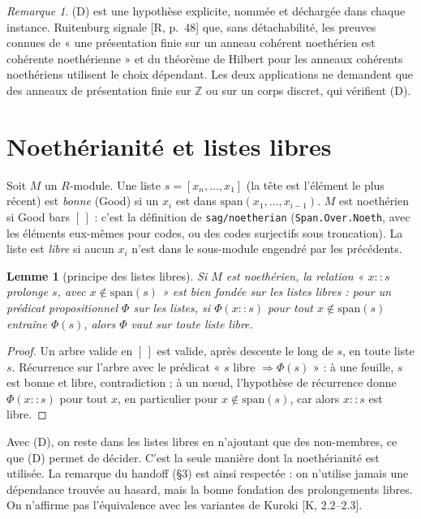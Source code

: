 \documentclass[11pt]{amsart}
\newtheorem{lemma}[theorem]{Lemme}
\theoremstyle{definition}
\theoremstyle{remark}
\newtheorem{remark}[theorem]{Remarque}
\newcommand{\sm}{\mathrm{span}}
\begin{document}
\begin{remark}
(D) est une hypothèse explicite, nommée et déchargée dans chaque
instance. Ruitenburg signale [R, p.~48] que, sans détachabilité, les
preuves connues de « une présentation finie sur un anneau cohérent
noethérien est cohérente noethérienne » et du théorème de Hilbert pour
les anneaux cohérents noethériens utilisent le choix dépendant. Les deux
applications ne demandent que des anneaux de présentation finie sur
$\mathbb Z$ ou sur un corps discret, qui vérifient (D).
\end{remark}

\section{Noethérianité et listes libres}\label{sec:noeth}

Soit $M$ un $R$-module. Une liste $s=[x_n,\dots,x_1]$ (la tête est
l'élément le plus récent) est \emph{bonne} (Good) si un $x_i$ est dans
$\sm(x_1,\dots,x_{i-1})$. $M$ est noethérien si Good bars $[\,]$ :
c'est la définition de \texttt{sag/noetherian} (\texttt{Span.Over.Noeth},
avec les éléments eux-mêmes pour codes, ou des codes surjectifs sous
troncation). La liste est \emph{libre} si aucun $x_i$ n'est dans le
sous-module engendré par les précédents.

\begin{lemma}[principe des listes libres]\label{lem:free}
Si $M$ est noethérien, la relation « $x::s$ prolonge $s$, avec $x\notin\sm(s)$ »
est bien fondée sur les listes libres : pour un prédicat propositionnel
$\Phi$ sur les listes, si $\Phi(x::s)$ pour tout $x\notin\sm(s)$ entraîne
$\Phi(s)$, alors $\Phi$ vaut sur toute liste libre.
\end{lemma}

\begin{proof}
Un arbre valide en $[\,]$ est valide, après descente le long de $s$, en
toute liste $s$. Récurrence sur l'arbre avec le prédicat
« $s$ libre $\Rightarrow\Phi(s)$ » : à une feuille, $s$ est bonne et libre,
contradiction ; à un n\oe ud, l'hypothèse de récurrence donne
$\Phi(x::s)$ pour tout $x$, en particulier pour $x\notin\sm(s)$, car
alors $x::s$ est libre.
\end{proof}

Avec (D), on reste dans les listes libres en n'ajoutant que des
non-membres, ce que (D) permet de décider. C'est la seule manière
dont la noethérianité est utilisée. La remarque du handoff
(\S3) est ainsi respectée : on n'utilise jamais une dépendance trouvée
au hasard, mais la bonne fondation des prolongements libres. On
n'affirme pas l'équivalence avec les variantes de Kuroki [K, 2.2--2.3].
\end{document}
